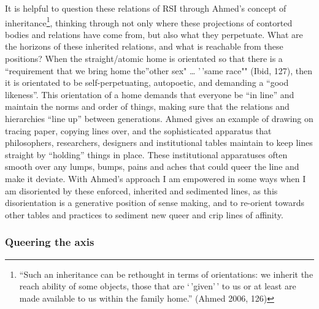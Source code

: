 It is helpful to question these relations of RSI through Ahmed's concept
of inheritance\footnote{``Such an inheritance can be rethought in terms
  of orientations: we inherit the reach ability of some objects, those
  that are `\,'given'\,' to us or at least are made available to us
  within the family home.'' (Ahmed 2006, 126)}, thinking through not
only where these projections of contorted bodies and relations have come
from, but also what they perpetuate. What are the horizons of these
inherited relations, and what is reachable from these positions? When
the straight/atomic home is orientated so that there is a ``requirement
that we bring home the''other sex" \ldots{} '\,'same race"" (Ibid, 127),
then it is orientated to be self-perpetuating, autopoetic, and demanding
a ``good likeness''. This orientation of a home demands that everyone be
``in line'' and maintain the norms and order of things, making sure that
the relations and hierarchies ``line up'' between generations. Ahmed
gives an example of drawing on tracing paper, copying lines over, and
the sophisticated apparatus that philosophers, researchers, designers
and institutional tables maintain to keep lines straight by ``holding''
things in place. These institutional apparatuses often smooth over any
lumps, bumps, pains and aches that could queer the line and make it
deviate. With Ahmed's approach I am empowered in some ways when I am
disoriented by these enforced, inherited and sedimented lines, as this
disorientation is a generative position of sense making, and to
re-orient towards other tables and practices to sediment new queer and
crip lines of affinity.

\hypertarget{queering-the-axis}{%
\subsubsection[Queering the
axis]{\texorpdfstring{\protect\hypertarget{anchor}{}{}Queering the
axis}{Queering the axis}}\label{queering-the-axis}}

